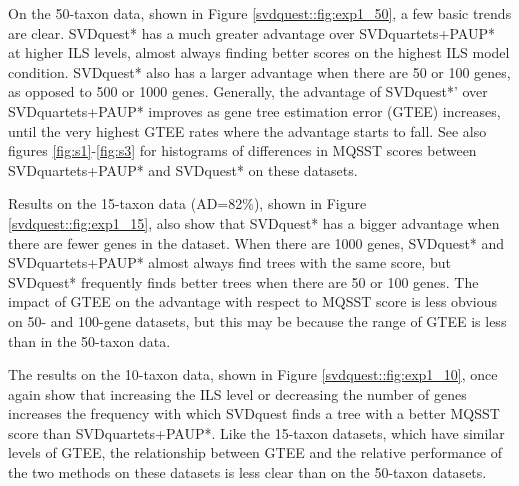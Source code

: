 On the 50-taxon data, shown in Figure \ref{svdquest::fig:exp1_50}, a few basic
trends are clear. 
SVDquest* has a much greater advantage over SVDquartets+PAUP* at
higher ILS levels, almost always finding better scores on the highest
ILS model condition. SVDquest* also has a larger advantage when there
are 50 or 100 genes, as opposed to 500 or 1000 genes. 
Generally, the advantage of 
SVDquest*' over SVDquartets+PAUP* improves as gene tree estimation error (GTEE)
increases, until the very highest GTEE rates where
the advantage starts to fall. 
See also figures \ref{fig:s1}-\ref{fig:s3} for  histograms of differences in MQSST scores between SVDquartets+PAUP* and SVDquest* on these datasets.

Results on the 15-taxon data (AD=82\%), shown in Figure \ref{svdquest::fig:exp1_15}, also show
that SVDquest* has a bigger advantage when there are fewer genes in
the dataset. When there are 1000 genes, SVDquest* and SVDquartets+PAUP* almost
always find trees with the same score, but SVDquest* frequently finds
better trees when there are 50 or 100 genes. 
The impact of GTEE on the advantage with respect to MQSST score is less obvious on 50- and 100-gene datasets, but this
may be because 
the range of GTEE is less than in the 50-taxon data.

The results on the 10-taxon data, shown in Figure \ref{svdquest::fig:exp1_10},
once again show that increasing the ILS level or decreasing
the number of genes increases the 
frequency with which SVDquest finds a tree with a better MQSST
score than SVDquartets+PAUP*.
 Like the 15-taxon datasets, which have
similar levels of GTEE,  the relationship
between GTEE and the relative performance of the two methods on these
datasets is less clear than on the 50-taxon datasets.



